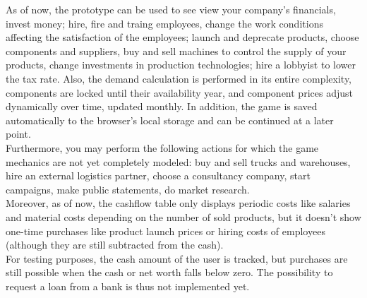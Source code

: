   As of now, the prototype can be used to see view your company's financials, invest money; hire, fire and traing employees, change the work conditions affecting the satisfaction of the employees; launch and deprecate products, choose components and suppliers, buy and sell machines to control the supply of your products, change investments in production technologies; hire a lobbyist to lower the tax rate. Also, the demand calculation is performed in its entire complexity, components are locked until their availability year, and component prices adjust dynamically over time, updated monthly. In addition, the game is saved automatically to the browser's local storage and can be continued at a later point.\\
  
  Furthermore, you may perform the following actions for which the game mechanics are not yet completely modeled: buy and sell trucks and warehouses, hire an external logistics partner, choose a consultancy company, start campaigns, make public statements, do market research.\\
  
  Moreover, as of now, the cashflow table only displays periodic costs like salaries and material costs depending on the number of sold products, but it doesn't show one-time purchases like product launch prices or hiring costs of employees (although they are still subtracted from the cash).\\
  
  For testing purposes, the cash amount of the user is tracked, but purchases are still possible when the cash or net worth falls below zero. The possibility to request a loan from a bank is thus not implemented yet.\\
 
